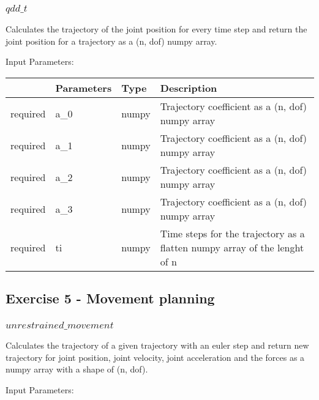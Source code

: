 \documentclass[
	ngerman,
	accentcolor=9c,%
	type=intern,
	marginpar=false
	]{tudapub}
\begin{document}
\subsubsection{$qdd\_t$}
\noindent Calculates the trajectory of the joint position for every time step and return the joint position for a trajectory as a (n, dof) numpy array.

\vspace{0.5cm}
\noindent Input Parameters:
\vspace{0.5cm}

\begin{tabular}{|p{}|p{}|p{}| p{}|}
\hline
 & \textbf{Parameters} & \textbf{Type} & \textbf{Description} \\
\hline
required & a\_0 & numpy & Trajectory coefficient as a (n, dof) numpy array \\
\hline
required & a\_1 & numpy & Trajectory coefficient as a (n, dof) numpy array \\
\hline
required & a\_2 & numpy & Trajectory coefficient as a (n, dof) numpy array \\
\hline
required & a\_3 & numpy & Trajectory coefficient as a (n, dof) numpy array \\
\hline
required & ti & numpy & Time steps for the trajectory as a flatten numpy array of the lenght of n \\
\hline
\end{tabular}
\vspace{1cm}


\subsection{Exercise 5 - Movement planning}
\subsubsection{$unrestrained\_movement$}
\noindent Calculates the trajectory of a given trajectory with an euler step and return new trajectory for joint position, joint velocity, joint acceleration and the forces as a numpy array with a shape of (n, dof).

\vspace{0.5cm}
\noindent Input Parameters:
\vspace{0.5cm}
\end{document}
